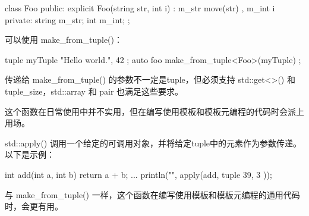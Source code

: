 \begin{cpp}
class Foo
{
    public:
        explicit Foo(string str, int i) : m_str { move(str) }, m_int { i } { }
    private:
        string m_str;
        int m_int;
};
\end{cpp}

可以使用 make\_from\_tuple()：

\begin{cpp}
tuple myTuple { "Hello world.", 42 };
auto foo { make_from_tuple<Foo>(myTuple) };
\end{cpp}

传递给 make\_from\_tuple() 的参数不一定是tuple，但必须支持 std::get<>() 和 tuple\_size，std::array 和 pair 也满足这些要求。

这个函数在日常使用中并不实用，但在编写使用模板和模板元编程的代码时会派上用场。


std::apply() 调用一个给定的可调用对象，并将给定tuple中的元素作为参数传递。以下是示例：

\begin{cpp}
int add(int a, int b) { return a + b; }
...
println("{}", apply(add, tuple { 39, 3 }));
\end{cpp}

与 make\_from\_tuple() 一样，这个函数在编写使用模板和模板元编程的通用代码时，会更有用。







